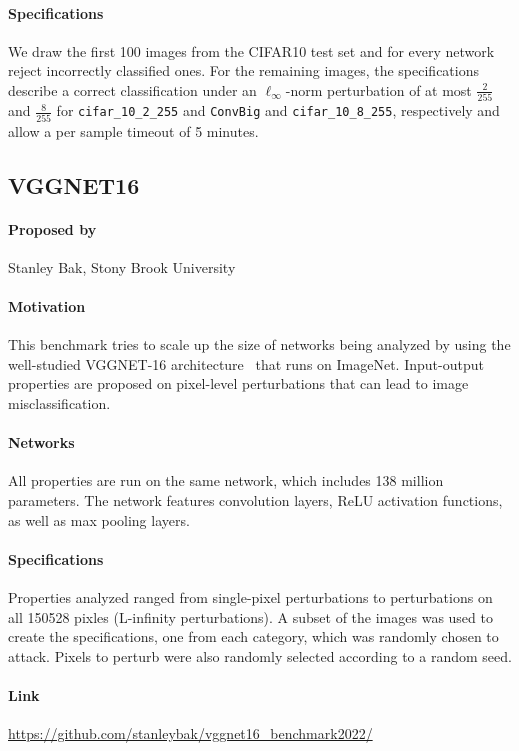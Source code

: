 \documentclass[oneside,11pt,dvipsnames]{book}
\numberwithin{equation}{section}
\theoremstyle{definition}
\theoremstyle{remark}
\begin{document}
\paragraph*{Specifications} We draw the first 100 images from the CIFAR10 test set and for every network reject incorrectly classified ones. For the remaining images, the specifications describe a correct classification under an $\ell_\infty$-norm perturbation of at most $\frac{2}{255}$ and $\frac{8}{255}$ for \texttt{cifar\_10\_2\_255} and \texttt{ConvBig} and \texttt{cifar\_10\_8\_255}, respectively and allow a per sample timeout of 5 minutes.


\subsection{VGGNET16}
\paragraph*{Proposed by} Stanley Bak, Stony Brook University

\paragraph*{Motivation} This benchmark tries to scale up the size of networks being analyzed by using the well-studied VGGNET-16 architecture~\cite{simonyan2014very} that runs on ImageNet. Input-output properties are proposed on pixel-level perturbations that can lead to image misclassification. 

\paragraph*{Networks} All properties are run on the same network, which includes 138 million parameters. The network features convolution layers, ReLU activation functions, as well as max pooling layers.

\paragraph*{Specifications} Properties analyzed ranged from single-pixel perturbations to perturbations on all 150528 pixles (L-infinity perturbations). A subset of the images was used to create the specifications, one from each category, which was randomly chosen to attack. Pixels to perturb were also randomly selected according to a random seed.

\paragraph*{Link} \url{https://github.com/stanleybak/vggnet16_benchmark2022/}
\end{document}
